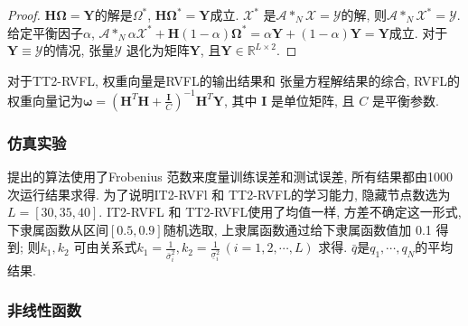 \begin{proof}
  $\bm H \bm \Omega=\bm Y$的解是$\Omega^*$, $\bm H \bm \Omega^*=\bm Y$成立.
  $\mathcal X^*$ 是$\mathcal A *_N \mathcal X=\mathcal Y$的解, 则$\mathcal A *_N \mathcal X^*=\mathcal Y$.
  给定平衡因子$\alpha$, $\mathcal A *_N  \alpha \mathcal X^*+\bm H (1-\alpha)\bm \Omega^*=\alpha \bm Y+(1-\alpha)\bm Y=\bm Y$成立.
  对于$\bm Y\equiv \mathcal Y$的情况, 张量$\mathcal Y$ 退化为矩阵$\bm Y$, 且$\bm Y\in \mathbb R^{L\times 2}$.
\end{proof}
\begin{remark}
    对于TT2-RVFL, 权重向量是RVFL的输出结果和 张量方程解结果的综合, RVFL的权重向量记为$\bm \omega=(\bm H^T \bm H+\frac {\bm I}  C)^{-1} \bm H^T \bm Y$, 其中 $\bm I$ 是单位矩阵, 且 $C$ 是平衡参数.
\end{remark}

\subsubsection{仿真实验} \label{TensorFLNsection4}
提出的算法使用了Frobenius 范数来度量训练误差和测试误差, 所有结果都由1000次运行结果求得. 为了说明IT2-RVFl 和 TT2-RVFL的学习能力, 隐藏节点数选为$L=[30,35,40]$.
IT2-RVFL 和 TT2-RVFL使用了均值一样, 方差不确定这一形式, 下隶属函数从区间$[0.5,0.9]$随机选取, 上隶属函数通过给下隶属函数值加 0.1 得到;
则$k_1, k_2$ 可由关系式$k_1=\frac{1} {\bar{\sigma} ^2_{i}}, k_2=\frac{1} {\underline{\sigma} ^2_{i}} \,(i=1,2,\cdots, L)$ 求得.
$\bar{q} $是$q_1, \cdots, q_N$的平均结果.
\subsubsection{非线性函数}

